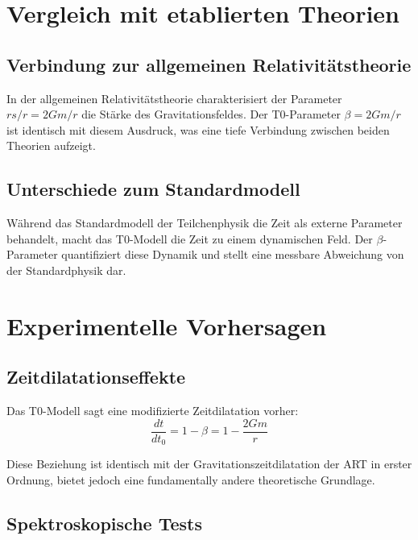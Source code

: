 \documentclass[12pt,a4paper]{article}
\begin{document}
	\section{Vergleich mit etablierten Theorien}
	\label{sec:theory_comparison}
	
	\subsection{Verbindung zur allgemeinen Relativitätstheorie}
	\label{subsec:gr_connection}
	
	In der allgemeinen Relativitätstheorie charakterisiert der Parameter $rs/r = 2Gm/r$ die Stärke des Gravitationsfeldes. Der T0-Parameter $\beta = 2Gm/r$ ist identisch mit diesem Ausdruck, was eine tiefe Verbindung zwischen beiden Theorien aufzeigt.
	
	\subsection{Unterschiede zum Standardmodell}
	\label{subsec:sm_differences}
	
	Während das Standardmodell der Teilchenphysik die Zeit als externe Parameter behandelt, macht das T0-Modell die Zeit zu einem dynamischen Feld. Der $\beta$-Parameter quantifiziert diese Dynamik und stellt eine messbare Abweichung von der Standardphysik dar.
	
	\section{Experimentelle Vorhersagen}
	\label{sec:experimental_predictions}
	
	\subsection{Zeitdilatationseffekte}
	\label{subsec:time_dilation}
	
	Das T0-Modell sagt eine modifizierte Zeitdilatation vorher:
	\begin{equation}
		\frac{dt}{dt_0} = 1 - \beta = 1 - \frac{2Gm}{r}
	\end{equation}
	
	Diese Beziehung ist identisch mit der Gravitationszeitdilatation der ART in erster Ordnung, bietet jedoch eine fundamentally andere theoretische Grundlage.
	
	\subsection{Spektroskopische Tests}
	\label{subsec:spectroscopic_tests}
	
\end{document}
